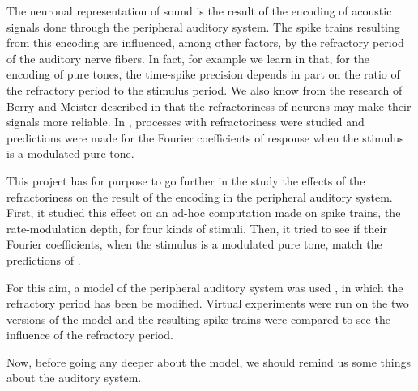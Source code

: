 The neuronal representation of sound is the result of the encoding of acoustic 
signals done through the peripheral auditory system. 
The spike trains resulting from this encoding are influenced, 
among other factors, by the refractory period of the auditory nerve fibers. 
In fact, for example we learn in \cite{AvissarPapier} that, for the encoding of pure tones, 
the time-spike precision depends in part on the ratio of  
the refractory period to the stimulus period. 
We also know from the research of Berry and Meister described 
in \cite{BerryMeister} that the refractoriness of neurons may make their signals 
more reliable. 
In \cite{Deger}, processes with refractoriness were studied and predictions 
were made for the Fourier coefficients of response 
when the stimulus is a modulated pure tone.%

This project has for purpose to go further in the study the effects of 
the refractoriness on the result of the encoding in the peripheral 
auditory system.  
First, it studied this effect on an ad-hoc computation made on spike trains,  
the rate-modulation depth, for four kinds of stimuli.
Then, it tried to see if their Fourier coefficients, 
when the stimulus is a  modulated pure tone, 
match the predictions of \cite{Deger}. 





For this aim, a model of the peripheral auditory system was used
\cite{Model1, Model2, Model3}, in which the refractory period has been be modified. 
Virtual experiments were run on the two versions of the model and the resulting 
spike trains were compared to see the influence of the refractory period.
 
Now, before going any deeper about the model, we should remind us some things 
about the auditory system.


